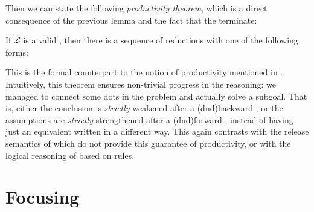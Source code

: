 Then we can state the following \emph{productivity theorem}, which is a direct
consequence of the previous lemma and the fact that the 
terminate:

\begin{theorem}[Productivity]
If $\mathcal{L}$ is a valid , then there
is a sequence of reductions with one of the following forms:
\end{theorem}

This is the formal counterpart to the notion of productivity mentioned in
. Intuitively, this theorem ensures non-trivial progress in the
reasoning: we managed to connect some dots in the problem and actually solve a
subgoal. That is, either the conclusion is \emph{strictly} weakened after a
\kl(dnd){backward} , or the assumptions are \emph{strictly} strengthened after a
\kl(dnd){forward} , instead of having just an equivalent  written in a different
way. This again contrasts with the
release semantics of  which do not provide this guarantee of
productivity, or with the logical reasoning  of  based on
 rules.

\section{Focusing}


